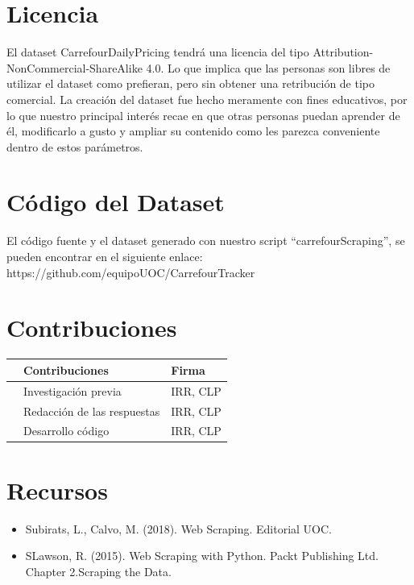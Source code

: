 \documentclass{article}
\begin{document}
\section{Licencia}
El dataset CarrefourDailyPricing tendrá una licencia del tipo Attribution-NonCommercial-ShareAlike 4.0. Lo que implica que las personas son libres de utilizar el dataset como prefieran, pero sin obtener una retribución de tipo comercial. La creación del dataset fue hecho meramente con fines educativos, por lo que nuestro principal interés recae en que otras personas puedan aprender de él, modificarlo a gusto y ampliar su contenido como les parezca conveniente dentro de estos parámetros.

\pagebreak
\section{Código del Dataset}
El código fuente y el dataset generado con nuestro script “carrefourScraping”, se pueden encontrar en el siguiente enlace: https://github.com/equipoUOC/CarrefourTracker

\section{Contribuciones}

\begin{table}[H]
    \centering
    \begin{tabular}{rll}
    & Contribuciones & Firma \\
    \hline
    & Investigación previa & IRR, CLP  \\
    & Redacción de las respuestas & IRR, CLP \\
    & Desarrollo código & IRR, CLP \\
    \end{tabular}
\end{table}


\section{Recursos}
\begin{itemize}
    \item Subirats, L., Calvo, M. (2018). Web Scraping. Editorial UOC.
    \item SLawson, R. (2015). Web Scraping with Python. Packt Publishing Ltd. Chapter 2.Scraping the Data.

\end{itemize}
\end{document}
